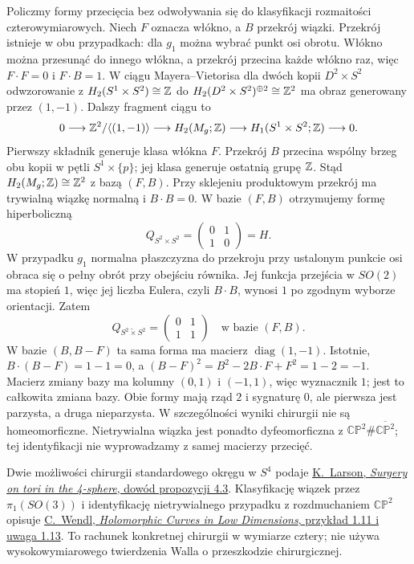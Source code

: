 \begin{przyklad}
Policzmy formy przecięcia bez odwoływania się do
klasyfikacji rozmaitości czterowymiarowych.
Niech $F$ oznacza włókno, a $B$ przekrój wiązki.
Przekrój istnieje w obu przypadkach: dla $g_1$
można wybrać punkt osi obrotu. Włókno można
przesunąć do innego włókna, a przekrój przecina
każde włókno raz, więc
$F\cdot F=0$ i $F\cdot B=1$.
W ciągu Mayera--Vietorisa dla dwóch kopii
$D^2\times S^2$ odwzorowanie z
$H_2(S^1\times S^2)\cong\mathbb{Z}$ do
$H_2(D^2\times S^2)^{\oplus2}\cong\mathbb{Z}^2$
ma obraz generowany przez $(1,-1)$.
Dalszy fragment ciągu to
\[
 0\longrightarrow\mathbb{Z}^2/\langle(1,-1)\rangle
 \longrightarrow H_2(M_g;\mathbb{Z})
 \longrightarrow H_1(S^1\times S^2;\mathbb{Z})
 \longrightarrow0.
\]
Pierwszy składnik generuje klasa włókna $F$.
Przekrój $B$ przecina wspólny brzeg obu
kopii w pętli $S^1\times\{p\}$; jej klasa
generuje ostatnią grupę $\mathbb{Z}$.
Stąd $H_2(M_g;\mathbb{Z})\cong\mathbb{Z}^2$
z bazą $(F,B)$.
Przy sklejeniu produktowym przekrój ma trywialną
wiązkę normalną i $B\cdot B=0$. W bazie $(F,B)$
otrzymujemy formę hiperboliczną
\[
 Q_{S^2\times S^2}
   =\begin{pmatrix}0&1\\1&0\end{pmatrix}=H.
\]
W przypadku $g_1$ normalna płaszczyzna do
przekroju przy ustalonym punkcie osi obraca się
o pełny obrót przy obejściu równika. Jej funkcja
przejścia w $SO(2)$ ma stopień $1$, więc jej
liczba Eulera, czyli $B\cdot B$, wynosi $1$
po zgodnym wyborze orientacji. Zatem
\[
 Q_{S^2\widetilde{\times}S^2}
   =\begin{pmatrix}0&1\\1&1\end{pmatrix}
   \quad\text{w bazie $(F,B)$}.
\]
W bazie $(B,B-F)$ ta sama forma ma macierz
$\operatorname{diag}(1,-1)$.
Istotnie, $B\cdot(B-F)=1-1=0$, a
$(B-F)^2=B^2-2B\cdot F+F^2=1-2=-1$.
Macierz zmiany bazy ma kolumny $(0,1)$ i $(-1,1)$,
więc wyznacznik $1$; jest to całkowita zmiana bazy.
Obie formy mają rząd $2$ i sygnaturę $0$,
ale pierwsza jest parzysta, a druga nieparzysta.
W szczególności wyniki chirurgii nie są homeomorficzne.
Nietrywialna wiązka jest ponadto dyfeomorficzna
z $\mathbb{CP}^2\#\overline{\mathbb{CP}^2}$; tej identyfikacji
nie wyprowadzamy z samej macierzy przecięć.

Dwie możliwości chirurgii standardowego okręgu
w $S^4$ podaje
\href{https://arxiv.org/abs/1502.06834}
{K.\ Larson, \emph{Surgery on tori in the 4-sphere},
dowód propozycji 4.3}. Klasyfikację wiązek przez
$\pi_1(SO(3))$ i identyfikację nietrywialnego
przypadku z rozdmuchaniem $\mathbb{CP}^2$ opisuje
\href{https://www.mathematik.hu-berlin.de/~wendl/pub/rationalRuled.pdf}
{C.\ Wendl, \emph{Holomorphic Curves in Low Dimensions},
przykład 1.11 i uwaga 1.13}.
To rachunek konkretnej chirurgii w wymiarze cztery;
nie używa wysokowymiarowego twierdzenia Walla
o przeszkodzie chirurgicznej.
\end{przyklad}

